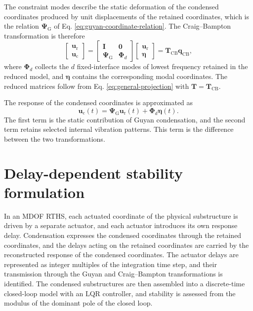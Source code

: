 \documentclass[a4paper,fleqn,review,12pt]{cas-sc}
\numberwithin{equation}{section}
\begin{document}
The constraint modes describe the static deformation of the condensed coordinates produced by unit displacements of the retained coordinates, which is the relation \(\bm{\Psi}_{\mathrm{G}}\) of Eq. \eqref{eq:guyan-coordinate-relation}. The Craig--Bampton transformation is therefore
\begin{equation}
  \begin{bmatrix}
    \bm{u}_{\mathrm{r}}\\
    \bm{u}_{\mathrm{c}}
  \end{bmatrix}
  =
  \begin{bmatrix}
    \mathbf{I} & \mathbf{0}\\
    \bm{\Psi}_{\mathrm{G}} & \bm{\Phi}_{d}
  \end{bmatrix}
  \begin{bmatrix}
    \bm{u}_{\mathrm{r}}\\
    \bm{\eta}
  \end{bmatrix}
  =\mathbf{T}_{\mathrm{CB}}\bm{q}_{\mathrm{CB}},
  \label{eq:cb-transformation}
\end{equation}
where \(\bm{\Phi}_{d}\) collects the \(d\) fixed-interface modes of lowest frequency retained in the reduced model, and \(\bm{\eta}\) contains the corresponding modal coordinates. The reduced matrices follow from Eq. \eqref{eq:general-projection} with \(\mathbf{T}=\mathbf{T}_{\mathrm{CB}}\).

The response of the condensed coordinates is approximated as
\begin{equation}
  \bm{u}_{\mathrm{c}}(t)
  =\bm{\Psi}_{\mathrm{G}}\bm{u}_{\mathrm{r}}(t)
  +\bm{\Phi}_{d}\bm{\eta}(t).
  \label{eq:cb-internal-recovery}
\end{equation}
The first term is the static contribution of Guyan condensation, and the second term retains selected internal vibration patterns. This term is the difference between the two transformations.

\section{Delay-dependent stability formulation} \label{sec3}

In an MDOF RTHS, each actuated coordinate of the physical substructure is driven by a separate actuator, and each actuator introduces its own response delay. Condensation expresses the condensed coordinates through the retained coordinates, and the delays acting on the retained coordinates are carried by the reconstructed response of the condensed coordinates. The actuator delays are represented as integer multiples of the integration time step, and their transmission through the Guyan and Craig--Bampton transformations is identified. The condensed substructures are then assembled into a discrete-time closed-loop model with an LQR controller, and stability is assessed from the modulus of the dominant pole of the closed loop.
\end{document}
